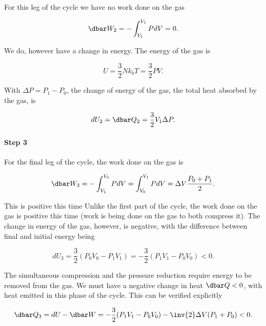 {For this leg of the cycle we have no work done on the gas

\begin{equation}\label{eqn:basicStatMechProblemSet4Problem2:140}
\dbar W_2 = -\int_{V_1}^{V_1} P dV = 0.
\end{equation}

We do, however have a change in energy.  The energy of the gas is

\begin{equation}\label{eqn:basicStatMechProblemSet4Problem2:160}
U = \frac{3}{2} N k_b T = \frac{3}{2} P V.
\end{equation}

With $\Delta P = P_1 - P_0$, the change of energy of the gas, the total heat absorbed by the gas, is

\begin{equation}\label{eqn:basicStatMechProblemSet4Problem2:180}
dU_2 = \dbar Q_2 = \frac{3}{2} V_1 \Delta P.
\end{equation}

\paragraph{Step 3}

For the final leg of the cycle, the work done on the gas is 

\begin{dmath}\label{eqn:basicStatMechProblemSet4Problem2:200}
\dbar W_3
= 
-\int_{V_1}^{V_0} P dV
= 
\int_{V_0}^{V_1} P dV
=
\Delta V \frac{P_0 + P_1}{2}.
\end{dmath}

This is positive this time 
Unlike the first part of the cycle, the work done on the gas is positive this time (work is being done on the gas to both compress it).  The change in energy of the gas, however, is negative, with the difference between final and initial energy being

\begin{dmath}\label{eqn:basicStatMechProblemSet4Problem2:220}
dU_3
= \frac{3}{2} (P_0 V_0 - P_1 V_1) 
= -\frac{3}{2} (P_1 V_1 - P_0 V_0) 
<0.
\end{dmath}

The simultaneous compression and the pressure reduction require energy to be removed from the gas.  We must have a negative change in heat $\dbar Q < 0$, with heat emitted in this phase of the cycle.  This can be verified explicitly

\begin{dmath}\label{eqn:basicStatMechProblemSet4Problem2:240}
\dbar Q_3
= dU - \dbar W 
= -\frac{3}{2} (P_1 V_1 - P_0 V_0) 
- \inv{2} \Delta V (P_1 + P_0)
< 0.
\end{dmath}

}
